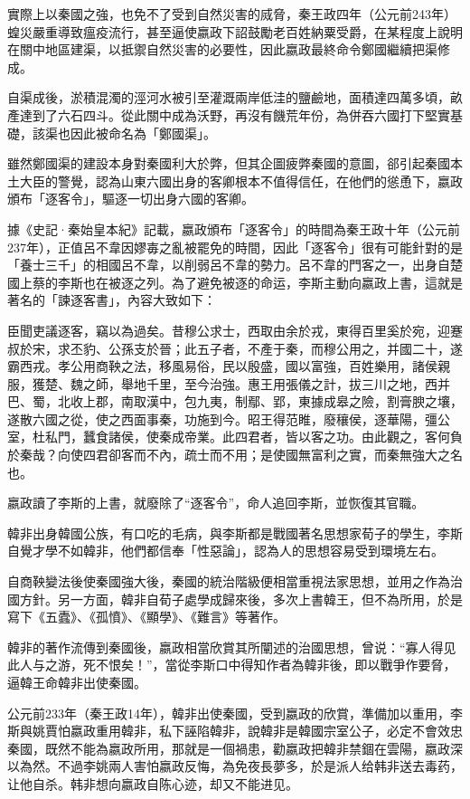 實際上以秦國之強，也免不了受到自然災害的烕脅，秦王政四年（公元前243年）蝗災嚴重導致瘟疫流行，甚至逼使嬴政下詔鼓勵老百姓納粟受爵，在某程度上說明在關中地區建渠，以抵禦自然災害的必要性，因此嬴政最終命令鄭國繼續把渠修成。

自渠成後，淤積混濁的涇河水被引至灌溉兩岸低洼的鹽鹼地，面積達四萬多頃，畝產達到了六石四斗。從此關中成為沃野，再沒有饑荒年份，為併吞六國打下堅實基礎，該渠也因此被命名為「鄭國渠」。

雖然鄭國渠的建設本身對秦國利大於弊，但其企圖疲弊秦國的意圖，郤引起秦國本土大臣的警覺，認為山東六國出身的客卿根本不值得信任，在他們的慫恿下，嬴政頒布「逐客令」，驅逐一切出身六國的客卿。

據《史記·秦始皇本紀》記載，嬴政頒布「逐客令」的時間為秦王政十年（公元前237年），正值呂不韋因嫪毐之亂被罷免的時間，因此「逐客令」很有可能針對的是「養士三千」的相國呂不韋，以削弱呂不韋的勢力。呂不韋的門客之一，出身自楚國上蔡的李斯也在被逐之列。為了避免被逐的命运，李斯主動向嬴政上書，這就是著名的「諫逐客書」，內容大致如下：

臣聞吏議逐客，竊以為過矣。昔穆公求士，西取由余於戎，東得百里奚於宛，迎蹇叔於宋，求丕豹、公孫支於晉；此五子者，不產于秦，而穆公用之，并國二十，遂霸西戎。孝公用商鞅之法，移風易俗，民以殷盛，國以富強，百姓樂用，諸侯親服，獲楚、魏之師，舉地千里，至今治強。惠王用張儀之計，拔三川之地，西并巴、蜀，北收上郡，南取漢中，包九夷，制鄢、郢，東據成皋之險，割膏腴之壤，遂散六國之從，使之西面事秦，功施到今。昭王得范睢，廢穰侯，逐華陽，彊公室，杜私門，蠶食諸侯，使秦成帝業。此四君者，皆以客之功。由此觀之，客何負於秦哉？向使四君卻客而不內，疏士而不用；是使國無富利之實，而秦無強大之名也。

嬴政讀了李斯的上書，就廢除了“逐客令”，命人追回李斯，並恢復其官職。

韓非出身韓國公族，有口吃的毛病，與李斯都是戰國著名思想家荀子的學生，李斯自覺才學不如韓非，他們都信奉「性惡論」，認為人的思想容易受到環境左右。

自商鞅變法後使秦國強大後，秦國的統治階級便相當重視法家思想，並用之作為治國方針。另一方面，韓非自荀子處學成歸來後，多次上書韓王，但不為所用，於是寫下《五蠹》、《孤憤》、《顯學》、《難言》等著作。

韓非的著作流傳到秦國後，嬴政相當欣賞其所闡述的治國思想，曾说：“寡人得见此人与之游，死不恨矣！”，當從李斯口中得知作者為韓非後，即以戰爭作要脅，逼韓王命韓非出使秦國。

公元前233年（秦王政14年），韓非出使秦國，受到嬴政的欣賞，準備加以重用，李斯與姚賈怕嬴政重用韓非，私下誣陷韓非，說韓非是韓國宗室公子，必定不會效忠秦國，既然不能為嬴政所用，那就是一個禍患，勸嬴政把韓非禁錮在雲陽，嬴政深以為然。不過李姚兩人害怕嬴政反悔，為免夜長夢多，於是派人给韩非送去毒药，让他自杀。韩非想向嬴政自陈心迹，却又不能进见。

